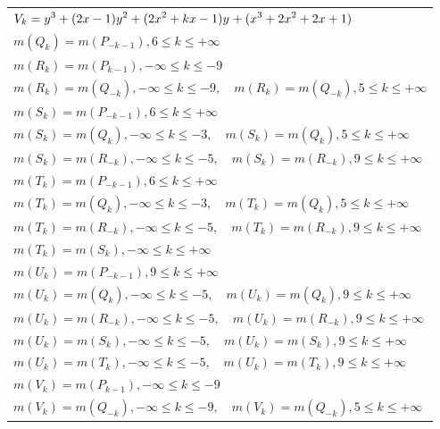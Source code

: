 \documentclass{amsart}
\begin{document}
\begin{longtable}{|l|}
\(\displaystyle V_k=y^{3}+(2\*x
 - 1)y^{2}+(2\*x^2
 + k\*x
 - 1)y^{}+(x^3
 + 2\*x^2
 + 2\*x
 + 1)\)\\
\(\displaystyle m(Q_k) = m(P_{-k
 - 1}),6 \leqslant k \leqslant +\infty\)\\
\(\displaystyle m(R_k) = m(P_{k
 - 1}),-\infty \leqslant k \leqslant -9\)\\
\(\displaystyle m(R_k) = m(Q_{-k}),-\infty \leqslant k \leqslant -9,\quad m(R_k) = m(Q_{-k}),5 \leqslant k \leqslant +\infty\)\\
\(\displaystyle m(S_k) = m(P_{-k
 - 1}),6 \leqslant k \leqslant +\infty\)\\
\(\displaystyle m(S_k) = m(Q_{k}),-\infty \leqslant k \leqslant -3,\quad m(S_k) = m(Q_{k}),5 \leqslant k \leqslant +\infty\)\\
\(\displaystyle m(S_k) = m(R_{-k}),-\infty \leqslant k \leqslant -5,\quad m(S_k) = m(R_{-k}),9 \leqslant k \leqslant +\infty\)\\
\(\displaystyle m(T_k) = m(P_{-k
 - 1}),6 \leqslant k \leqslant +\infty\)\\
\(\displaystyle m(T_k) = m(Q_{k}),-\infty \leqslant k \leqslant -3,\quad m(T_k) = m(Q_{k}),5 \leqslant k \leqslant +\infty\)\\
\(\displaystyle m(T_k) = m(R_{-k}),-\infty \leqslant k \leqslant -5,\quad m(T_k) = m(R_{-k}),9 \leqslant k \leqslant +\infty\)\\
\(\displaystyle m(T_k) = m(S_{k}),-\infty \leqslant k \leqslant +\infty\)\\
\(\displaystyle m(U_k) = m(P_{-k
 - 1}),9 \leqslant k \leqslant +\infty\)\\
\(\displaystyle m(U_k) = m(Q_{k}),-\infty \leqslant k \leqslant -5,\quad m(U_k) = m(Q_{k}),9 \leqslant k \leqslant +\infty\)\\
\(\displaystyle m(U_k) = m(R_{-k}),-\infty \leqslant k \leqslant -5,\quad m(U_k) = m(R_{-k}),9 \leqslant k \leqslant +\infty\)\\
\(\displaystyle m(U_k) = m(S_{k}),-\infty \leqslant k \leqslant -5,\quad m(U_k) = m(S_{k}),9 \leqslant k \leqslant +\infty\)\\
\(\displaystyle m(U_k) = m(T_{k}),-\infty \leqslant k \leqslant -5,\quad m(U_k) = m(T_{k}),9 \leqslant k \leqslant +\infty\)\\
\(\displaystyle m(V_k) = m(P_{k
 - 1}),-\infty \leqslant k \leqslant -9\)\\
\(\displaystyle m(V_k) = m(Q_{-k}),-\infty \leqslant k \leqslant -9,\quad m(V_k) = m(Q_{-k}),5 \leqslant k \leqslant +\infty\)\\

\end{longtable}
\end{document}
